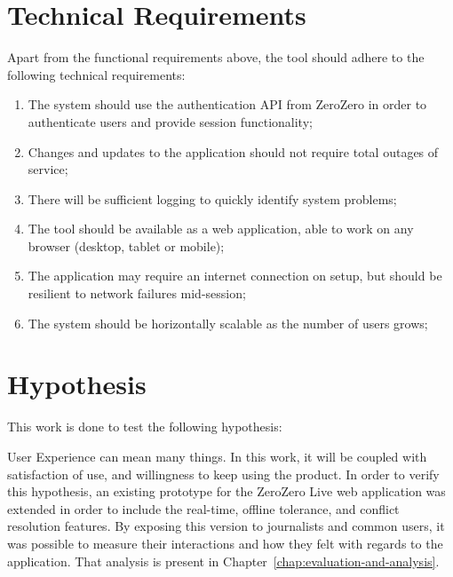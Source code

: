 \section{Technical Requirements}\label{sec:tech-reqs}

Apart from the functional requirements above, the tool should adhere to the following technical requirements:

\begin{enumerate}[leftmargin  = 3.25\parindent, align=left, label=TR\arabic*, start=1]
    \item The system should use the authentication API from ZeroZero in order to authenticate users and provide session functionality;
    \item Changes and updates to the application should not require total outages of service;
    \item There will be sufficient logging to quickly identify system problems;
    \item The tool should be available as a web application, able to work on any browser (desktop, tablet or mobile);
    \item The application may require an internet connection on setup, but should be resilient to network failures mid-session;
    \item The system should be horizontally scalable as the number of users grows;
\end{enumerate}

\section{Hypothesis}\label{sec-hyposthesis}

This work is done to test the following hypothesis:

\begin{quote}
\end{quote}

User Experience can mean many things. In this work, it will be coupled with satisfaction of use, and willingness to keep using the product. In order to verify this hypothesis, an existing prototype for the ZeroZero Live web application was extended in order to include the real-time, offline tolerance, and conflict resolution features. By exposing this version to journalists and common users, it was possible to measure their interactions and how they felt with regards to the application. That analysis is present in Chapter~\ref{chap:evaluation-and-analysis}.

